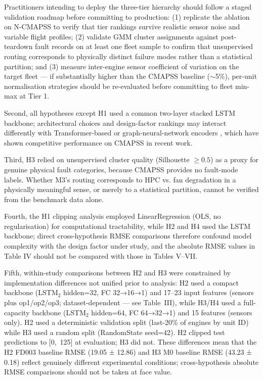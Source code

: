 \documentclass[review,12pt]{elsarticle}
\begin{document}
Practitioners intending to deploy the three-tier hierarchy should follow a staged validation roadmap before committing to production: (1) replicate the ablation on N-CMAPSS to verify that tier rankings survive realistic sensor noise and variable flight profiles; (2) validate GMM cluster assignments against post-teardown fault records on at least one fleet sample to confirm that unsupervised routing corresponds to physically distinct failure modes rather than a statistical partition; and (3) measure inter-engine sensor coefficient of variation on the target fleet --- if substantially higher than the CMAPSS baseline ($\sim$5\%), per-unit normalisation strategies should be re-evaluated before committing to fleet min-max at Tier 1.

Second, all hypotheses except H1 used a common two-layer stacked LSTM backbone; architectural choices and design-factor rankings may interact differently with Transformer-based or graph-neural-network encoders \cite{ref08,ref11,ref13,ref14}, which have shown competitive performance on CMAPSS in recent work.

Third, H3 relied on unsupervised cluster quality (Silhouette $\geq 0.5$) as a proxy for genuine physical fault categories, because CMAPSS provides no fault-mode labels. Whether M3's routing corresponds to HPC vs. fan degradation in a physically meaningful sense, or merely to a statistical partition, cannot be verified from the benchmark data alone.

Fourth, the H1 clipping analysis employed LinearRegression (OLS, no regularisation) for computational tractability, while H2 and H4 used the LSTM backbone; direct cross-hypothesis RMSE comparisons therefore confound model complexity with the design factor under study, and the absolute RMSE values in Table IV should not be compared with those in Tables V–VII.

Fifth, within-study comparisons between H2 and H3 were constrained by implementation differences not unified prior to analysis: H2 used a compact backbone (LSTM$_2$ hidden=32, FC 32→16→1) and 17--23 input features (sensors plus op1/op2/op3; dataset-dependent — see Table~III), while H3/H4 used a full-capacity backbone (LSTM$_2$ hidden=64, FC 64→32→1) and 15 features (sensors only). H2 used a deterministic validation split (last-20\% of engines by unit ID) while H3 used a random split (RandomState seed=42). H2 clipped test predictions to [0,~125] at evaluation; H3 did not. These differences mean that the H2 FD003 baseline RMSE (19.05 ± 12.86) and H3 M0 baseline RMSE (43.23 ± 0.18) reflect genuinely different experimental conditions; cross-hypothesis absolute RMSE comparisons should not be taken at face value.
\end{document}
